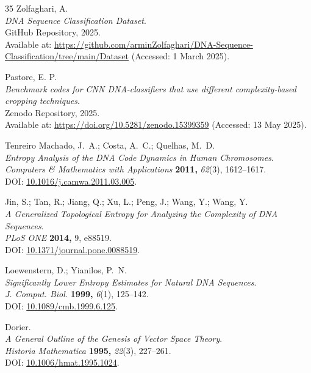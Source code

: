 \documentclass{article}
\theoremstyle{remark}
\begin{document}
\begin{thebibliography}{35}
Zolfaghari, A.\\
\textit{DNA Sequence Classification Dataset}.\\
GitHub Repository, 2025.\\
Available at: \url{https://github.com/arminZolfaghari/DNA-Sequence-Classification/tree/main/Dataset} (Accessed: 1 March 2025).

Pastore, E. P.\\
\textit{Benchmark codes for CNN DNA-classifiers that use different complexity-based cropping techniques}.\\
Zenodo Repository, 2025.\\
Available at: \url{https://doi.org/10.5281/zenodo.15399359} (Accessed: 13 May 2025).



Tenreiro Machado, J.~A.; Costa, A.~C.; Quelhas, M.~D.\\
\textit{Entropy Analysis of the DNA Code Dynamics in Human Chromosomes}.\\
\textit{Computers \& Mathematics with Applications} \textbf{2011,} \textit{62}(3), 1612--1617.\\
DOI: \href{https://doi.org/10.1016/j.camwa.2011.03.005}{10.1016/j.camwa.2011.03.005}.

Jin, S.; Tan, R.; Jiang, Q.; Xu, L.; Peng, J.; Wang, Y.; Wang, Y.\\
\textit{A Generalized Topological Entropy for Analyzing the Complexity of DNA Sequences}.\\
\textit{PLoS ONE} \textbf{2014,} 9, e88519.\\
DOI: \href{https://doi.org/10.1371/journal.pone.0088519}{10.1371/journal.pone.0088519}.

Loewenstern, D.; Yianilos, P.~N.\\
\textit{Significantly Lower Entropy Estimates for Natural DNA Sequences}.\\
\textit{J. Comput. Biol.} \textbf{1999,} \textit{6}(1), 125--142.\\
DOI: \href{https://doi.org/10.1089/cmb.1999.6.125}{10.1089/cmb.1999.6.125}.

Dorier.\\
\textit{A General Outline of the Genesis of Vector Space Theory}.\\
\textit{Historia Mathematica} \textbf{1995,} \textit{22}(3), 227--261.\\
DOI: \href{https://doi.org/10.1006/hmat.1995.1024}{10.1006/hmat.1995.1024}.


\end{thebibliography}
\end{document}
